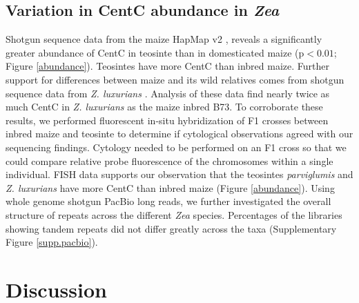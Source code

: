 {\subsection*{Variation in CentC abundance in \emph{Zea}}

Shotgun sequence data from the maize HapMap v2 \citep{Chia2012}, reveals a significantly greater abundance of CentC in teosinte than in domesticated maize (p$<0.01$; Figure \ref{abundance}). Teosintes have more CentC than inbred maize.  Further support for differences between maize and its wild relatives comes from shotgun sequence data from \emph{Z. luxurians} \citep{Tenaillon2011}.  Analysis of these data find nearly twice as much CentC in \emph{Z. luxurians} as the maize inbred B73.  To corroborate these results, we performed fluorescent in-situ hybridization of F1 crosses between inbred maize and teosinte to determine if cytological observations agreed with our sequencing findings.  Cytology needed to be performed on an F1 cross so that we could compare relative probe fluorescence of the chromosomes within a single individual.  FISH data supports our observation that the teosintes \emph{parviglumis} and \emph{Z. luxurians} have more CentC than inbred maize (Figure \ref{abundance}).  Using whole genome shotgun PacBio long reads, we further investigated the overall structure of repeats across the different \emph{Zea} species.  Percentages of the libraries showing tandem repeats did not differ greatly across the taxa (Supplementary Figure \ref{supp.pacbio}).

\section*{Discussion}
\label{discussion}



}
